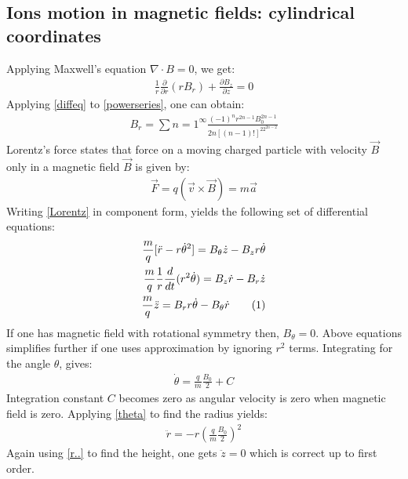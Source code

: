 \documentclass[twocolumn,12pt]{article}
\newcommand\numberthis{\addtocounter{equation}{1}\tag{\theequation}} %
\numberwithin{equation}{section} %
\numberwithin{equation}{section}
\begin{document}
\subsection{Ions motion in magnetic fields: cylindrical coordinates}
Applying Maxwell's equation $\nabla \cdot B =0$, 
we get: 
\begin{align}
\frac {1}{r} \frac {\partial}{\partial r}(rB_r) + \frac{\partial B_z}{\partial z}=0 
\label{Maxwell}
\end{align}
Applying \ref{diffeq} to \ref{powerseries}, one can obtain:
\begin{align}
B_r= \sum{n=1} ^\infty \frac{(-1)^nr^{2n-1}B_0^{2n-1}}{2n[(n-1)!]^22^{2n-2}}
\end{align}
Lorentz's force states that force on a moving charged particle with velocity $\vec{B}$ only in a magnetic field $\vec{B}$ is given by:
\begin{align}
\vec{F}=q(\vec{v} \times \vec{B})= m \vec{a}
\label{Lorentz}
\end{align}
Writing \ref{Lorentz} in component form, yields the following set of differential equations:
\begin{align*}
    \frac{m}{q}[\ddot{r}-r\dot{\theta}^2]=B_\theta \dot{z}- B_zr\dot{\theta}\\
    \frac{m}{q}\frac{1}{r}\frac{d}{dt}(r^2\dot{\theta})= B_z\dot{r}-B_r\dot{z}\\
    \frac{m}{q}\ddot{z}=B_rr\dot{\theta}-B_{\theta}\dot{r} \numberthis
    \label{NLComp}
\end{align*}
If one has magnetic field with rotational symmetry then, $B_\theta=0$. Above equations simplifies further if one uses approximation by ignoring $r^2$ terms. \cite{booktheory}
Integrating for the angle $\theta$, gives:
\begin{align}
    \dot{\theta}=\frac{q}{m} \frac{B_0}{2} + C
    \label{theta}
\end{align}
Integration constant $C$ becomes zero as angular velocity is zero when magnetic field is zero. Applying \ref{theta} to find the radius yields:
\begin{align}
    \ddot{r}=-r\left(\frac{q}{m}\frac{B_0}{2}\right)^2
    \label{r..}
\end{align}
Again using \ref{r..} to find the height, one gets $\ddot{z} =0$ which is correct up to first order. 
\end{document}
